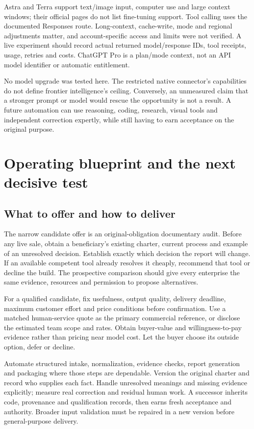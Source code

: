 \documentclass[11pt]{article}
\begin{document}
Astra and Terra support text/image input, computer use and large context windows; their official pages do not list fine-tuning support. Tool calling uses the documented Responses route. Long-context, cache-write, mode and regional adjustments matter, and account-specific access and limits were not verified. A live experiment should record actual returned model/response IDs, tool receipts, usage, retries and costs. ChatGPT Pro is a plan/mode context, not an API model identifier or automatic entitlement.\cite{astra,terra,models,plan}

No model upgrade was tested here. The restricted native connector's capabilities do not define frontier intelligence's ceiling. Conversely, an unmeasured claim that a stronger prompt or model would rescue the opportunity is not a result. A future automation can use reasoning, coding, research, visual tools and independent correction expertly, while still having to earn acceptance on the original purpose.

\section{Operating blueprint and the next decisive test}
\subsection{What to offer and how to deliver}
The narrow candidate offer is an original-obligation documentary audit. Before any live sale, obtain a beneficiary's existing charter, current process and example of an unresolved decision. Establish exactly which decision the report will change. If an available competent tool already resolves it cheaply, recommend that tool or decline the build. The prospective comparison should give every enterprise the same evidence, resources and permission to propose alternatives.

For a qualified candidate, fix usefulness, output quality, delivery deadline, maximum customer effort and price conditions before confirmation. Use a matched human-service quote as the primary commercial reference, or disclose the estimated team scope and rates. Obtain buyer-value and willingness-to-pay evidence rather than pricing near model cost. Let the buyer choose its outside option, defer or decline.

Automate structured intake, normalization, evidence checks, report generation and packaging where those steps are dependable. Version the original charter and record who supplies each fact. Handle unresolved meanings and missing evidence explicitly; measure real correction and residual human work. A successor inherits code, provenance and qualification records, then earns fresh acceptance and authority. Broader input validation must be repaired in a new version before general-purpose delivery.
\end{document}
